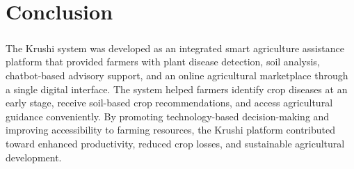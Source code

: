 
\chapter{Conclusion}

\paragraph{} The Krushi system was developed as an integrated smart agriculture assistance platform that provided farmers with plant disease detection, soil analysis, chatbot-based advisory support, and an online agricultural marketplace through a single digital interface. The system helped farmers identify crop diseases at an early stage, receive soil-based crop recommendations, and access agricultural guidance conveniently. By promoting technology-based decision-making and improving accessibility to farming resources, the Krushi platform contributed toward enhanced productivity, reduced crop losses, and sustainable agricultural development.

